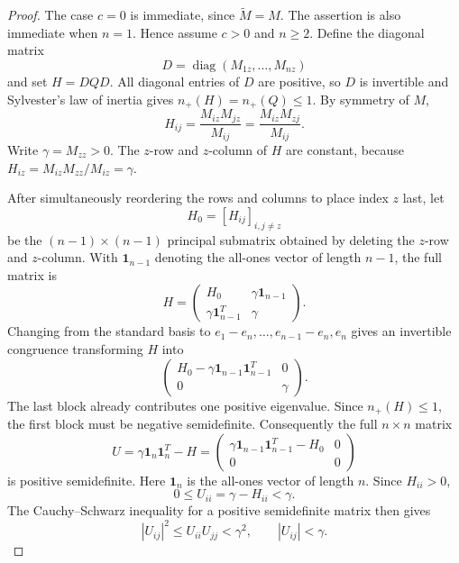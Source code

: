 \begin{proof}
The case $c=0$ is immediate, since $\widetilde M=M$.
The assertion is also immediate when $n=1$. Hence assume
$c>0$ and $n\ge2$. Define the diagonal matrix
\[
 D=\operatorname{diag}(M_{1z},\ldots,M_{nz})
\]
and set $H=DQD$. All diagonal entries of $D$ are positive, so $D$
is invertible and Sylvester's law of inertia gives
$n_+(H)=n_+(Q)\le1$. By symmetry of $M$,
\[
 H_{ij}=\frac{M_{iz}M_{jz}}{M_{ij}}
       =\frac{M_{iz}M_{zj}}{M_{ij}}.
\]
Write $\gamma=M_{zz}>0$. The $z$-row and $z$-column of $H$ are
constant, because $H_{iz}=M_{iz}M_{zz}/M_{iz}=\gamma$.

After simultaneously reordering the rows and columns to place
index $z$ last, let
\[
 H_0=[H_{ij}]_{i,j\ne z}
\]
be the $(n-1)\times(n-1)$ principal submatrix obtained by deleting
the $z$-row and $z$-column. With $\mathbf1_{n-1}$ denoting the
all-ones vector of length $n-1$, the full matrix is
\[
 H=\begin{pmatrix}
 H_0&\gamma\mathbf1_{n-1}\\
 \gamma\mathbf1_{n-1}^T&\gamma
 \end{pmatrix}.
\]
Changing from the standard basis to
$e_1-e_n,\ldots,e_{n-1}-e_n,e_n$ gives an invertible congruence
transforming $H$ into
\[
 \begin{pmatrix}
 H_0-\gamma\mathbf1_{n-1}\mathbf1_{n-1}^T&0\\
 0&\gamma
 \end{pmatrix}.
\]
The last block already contributes one positive eigenvalue.
Since $n_+(H)\le1$, the first block must be negative semidefinite.
Consequently the full $n\times n$ matrix
\[
 U=\gamma\mathbf1_n\mathbf1_n^T-H
  =\begin{pmatrix}
    \gamma\mathbf1_{n-1}\mathbf1_{n-1}^T-H_0&0\\
    0&0
   \end{pmatrix}
\]
is positive semidefinite. Here $\mathbf1_n$ is the all-ones vector
of length $n$. Since $H_{ii}>0$,
\[
 0\le U_{ii}=\gamma-H_{ii}<\gamma.
\]
The Cauchy--Schwarz inequality for a positive semidefinite matrix
then gives
\[
 |U_{ij}|^2\le U_{ii}U_{jj}<\gamma^2,
 \qquad |U_{ij}|<\gamma.
\]


\end{proof}
